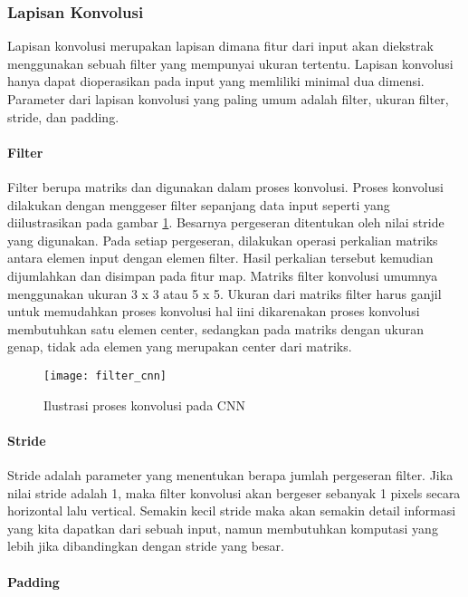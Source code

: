 \documentclass[../thesis.tex]{subfiles}
\begin{document}
\subsubsection{Lapisan Konvolusi}
Lapisan konvolusi merupakan lapisan dimana fitur dari input akan diekstrak menggunakan sebuah filter yang mempunyai ukuran tertentu. Lapisan konvolusi hanya dapat
dioperasikan pada input yang memliliki minimal dua dimensi. Parameter dari lapisan konvolusi yang paling umum adalah filter, ukuran filter, stride, dan padding.

\paragraph{Filter}

Filter berupa matriks dan digunakan dalam proses konvolusi. Proses konvolusi dilakukan dengan menggeser filter sepanjang data input seperti yang diilustrasikan pada gambar \ref{konvolusi_CNN}. Besarnya pergeseran ditentukan oleh nilai stride yang digunakan. Pada setiap pergeseran, dilakukan operasi perkalian matriks antara elemen input dengan elemen filter. Hasil perkalian tersebut kemudian dijumlahkan dan 
disimpan pada fitur map. Matriks filter konvolusi umumnya menggunakan ukuran 3 x 3 atau 5 x 5. Ukuran dari matriks filter harus ganjil untuk memudahkan proses konvolusi hal iini dikarenakan proses konvolusi membutuhkan satu elemen center, sedangkan pada matriks dengan ukuran genap, tidak ada elemen yang merupakan center dari matriks.

\begin{figure}
	\centering
	\texttt{[image: filter\_cnn]}
	\caption{Ilustrasi proses konvolusi pada CNN}
	\label{konvolusi_CNN}
\end{figure}

\paragraph{Stride}

Stride adalah parameter yang menentukan berapa jumlah pergeseran filter. Jika nilai stride adalah 1, maka filter konvolusi akan bergeser sebanyak 1 pixels secara horizontal lalu vertical. 
Semakin kecil stride maka akan semakin detail informasi yang kita dapatkan dari sebuah input, namun membutuhkan komputasi yang lebih jika dibandingkan dengan stride yang besar.

\paragraph{Padding}
\end{document}
